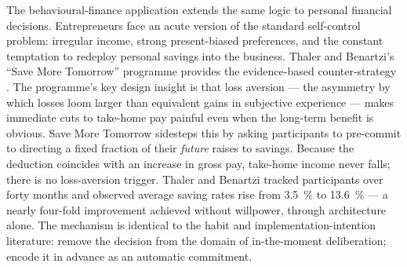 The behavioural-finance application extends the same logic to personal financial decisions.
Entrepreneurs face an acute version of the standard self-control problem: irregular income,
strong present-biased preferences, and the constant temptation to redeploy personal savings into
the business. Thaler and Benartzi's ``Save More Tomorrow'' programme provides the
evidence-based counter-strategy \parencite{thaler2004save}. The programme's key design insight
is that loss aversion --- the asymmetry by which losses loom larger than equivalent gains in
subjective experience --- makes immediate cuts to take-home pay painful even when the long-term
benefit is obvious. Save More Tomorrow sidesteps this by asking participants to pre-commit to
directing a fixed fraction of their \emph{future} raises to savings. Because the deduction
coincides with an increase in gross pay, take-home income never falls; there is no loss-aversion
trigger. Thaler and Benartzi tracked participants over forty months and observed average saving
rates rise from \qty{3.5}{\percent} to \qty{13.6}{\percent} --- a nearly four-fold improvement
achieved without willpower, through architecture alone. The mechanism is identical to the habit
and implementation-intention literature: remove the decision from the domain of in-the-moment
deliberation; encode it in advance as an automatic commitment.

